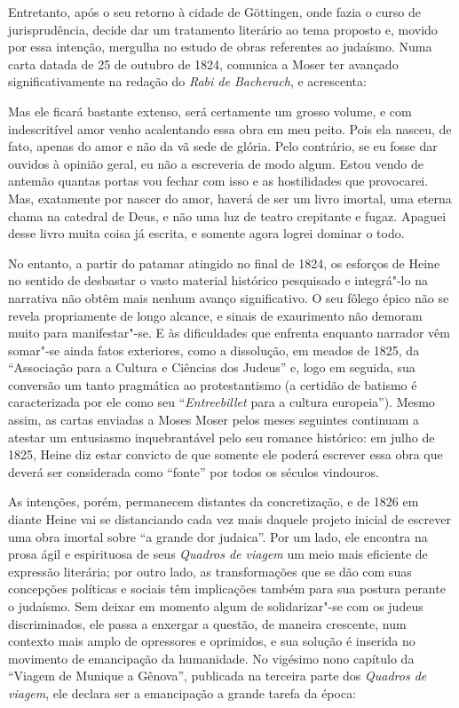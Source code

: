 Entretanto, após o seu retorno à cidade de Göttingen, onde fazia o curso
de jurisprudência, decide dar um tratamento literário ao tema proposto
e, movido por essa intenção, mergulha no estudo de obras referentes ao
judaísmo. Numa carta datada de 25 de outubro de 1824, comunica a Moser
ter avançado significativamente na redação do \textit{Rabi de
Bacherach}, e acrescenta: 
\begin{hedraquote}
Mas ele ficará bastante extenso, será
certamente um grosso volume, e com indescritível amor venho acalentando
essa obra em meu peito. Pois ela nasceu, de fato, apenas do amor e não
da vã sede de glória. Pelo contrário, se eu fosse dar ouvidos à opinião
geral, eu não a escreveria de modo algum. Estou vendo de antemão
quantas portas vou fechar com isso e as hostilidades que provocarei.
Mas, exatamente por nascer do amor, haverá de ser um livro imortal, uma
eterna chama na catedral de Deus, e não uma luz de teatro crepitante e
fugaz. Apaguei desse livro muita coisa já escrita, e somente agora
logrei dominar o todo.
\end{hedraquote}

No entanto, a partir do patamar atingido no final de 1824, os esforços
de Heine no sentido de desbastar o vasto material histórico pesquisado
e integrá"-lo na narrativa não obtêm mais nenhum avanço significativo.
O seu fôlego épico não se revela propriamente de longo alcance, e
sinais de exaurimento não demoram muito para manifestar"-se. E  às
dificuldades que enfrenta enquanto narrador vêm somar"-se ainda fatos
exteriores, como a dissolução, em meados de 1825, da “Associação para a
Cultura e Ciências dos Judeus” e, logo em seguida, sua conversão um
tanto pragmática ao protestantismo (a certidão de batismo é
caracterizada por ele como seu “\textit{Entreebillet} para a cultura
europeia”). Mesmo assim, as cartas enviadas a Moses Moser pelos meses
seguintes continuam a atestar um entusiasmo inquebrantável pelo seu
romance histórico: em julho de 1825, Heine diz estar convicto de que
somente ele poderá escrever essa obra que deverá ser considerada como
“fonte” por todos os séculos vindouros.

As intenções, porém, permanecem distantes da concretização, e de 1826 em
diante Heine vai se distanciando cada vez mais daquele projeto inicial
de escrever uma obra imortal sobre “a grande dor judaica”. Por um lado,
ele encontra na prosa ágil e espirituosa de seus \textit{Quadros de
viagem} um meio mais eficiente de expressão literária; por outro lado,
as transformações que se dão com suas concepções políticas e sociais
têm implicações também para sua postura perante o judaísmo. Sem deixar
em momento algum de solidarizar"-se com os judeus discriminados, ele
passa a enxergar a questão, de maneira crescente, num contexto mais
amplo de opressores e oprimidos, e sua solução é inserida no movimento
de emancipação da humanidade. No vigésimo nono capítulo da “Viagem de
Munique a Gênova”, publicada na terceira parte dos \textit{Quadros de
viagem}, ele declara ser a emancipação a grande tarefa da época: 

